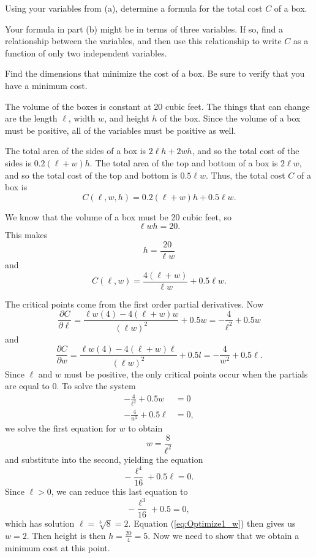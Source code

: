 \begin{exercises}
    \item Using your variables from (a), determine a formula for the total cost $C$ of a box.


    \item Your formula in part (b) might be in terms of three variables. If so, find a relationship between the variables, and then use this relationship to write $C$ as a function of only two independent variables.


    \item Find the dimensions that minimize the cost of a box. Be sure to verify that you have a minimum cost.


	\ea

\begin{exerciseSolution}
\ba
\item The volume of the boxes is constant at 20 cubic feet. The things that can change are the length $\ell$, width $w$, and height $h$ of the box. Since the volume of a box must be positive, all of the variables must be positive as well.

\item The total area of the sides of a box is $2\ell h + 2wh$, and so the total cost of the sides is $0.2(\ell+w)h$. The total area of the top and bottom of a box is $2\ell w$, and so the total cost of the top and bottom is $0.5\ell w$. Thus, the total cost $C$ of a box is
\[C(\ell,w,h) = 0.2(\ell+w)h + 0.5\ell w.\]

\item We know that the volume of a box must be 20 cubic feet, so
\[\ell wh = 20.\]
This makes
\[h = \frac{20}{\ell w}\]
and
\[C(\ell,w) = \frac{4(\ell+w)}{\ell w} + 0.5\ell w.\]

\item The critical points come from the first order partial derivatives. Now
\[\frac{\partial C}{\partial \ell} = \frac{\ell w(4)-4(\ell+w)w}{(\ell w)^2} + 0.5w = -\frac{4}{\ell^2} + 0.5w\]
and
\[\frac{\partial C}{\partial w} = \frac{\ell w(4)-4(\ell +w)\ell}{(\ell w)^2} + 0.5l = -\frac{4}{w^2} + 0.5\ell.\]
Since $\ell$ and $w$ must be positive, the only critical points occur when the partials are equal to 0. To solve the system
\begin{align*}
-\frac{4}{\ell^2} + 0.5w &= 0 \\
-\frac{4}{w^2} + 0.5\ell &= 0,
\end{align*}
we solve the first equation for $w$ to obtain
\begin{equation} \label{eq:Optimize1_w}
w = \frac{8}{\ell^2}
\end{equation}
and substitute into the second, yielding the equation
\[-\frac{\ell^4}{16} + 0.5\ell = 0.\]
Since $\ell > 0$, we can reduce this last equation to
\[-\frac{\ell^3}{16} + 0.5 = 0,\]
which has solution $\ell = \sqrt[3]{8} = 2$. Equation (\ref{eq:Optimize1_w}) then gives us $w = 2$. Then height is then ${h=\frac{20}{4} = 5}$.  Now we need to show that we obtain a minimum cost at this point.


\end{exerciseSolution}
\end{exercises}

